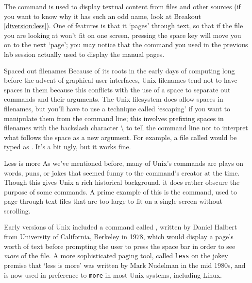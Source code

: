 
The  command is used to display textual content from files and other sources (if you want to know why it has such an odd name, look at Breakout \ref{diversion:less}). One of  features is that it `pages' through text, so that if the file you are looking at won't fit on one screen, pressing the space key will move you on to the next `page'; you may notice that the  command you used in the previous lab session actually used  to display the manual pages.

\begin{linux}{Spaced out filenames}
Because of its roots in the early days of computing long before the advent of graphical user interfaces, Unix filenames tend not to have spaces in them because this conflicts with the use of a space to separate out commands and their arguments. The Unix filesystem does allow spaces in filenames, but you'll have to use a technique called `escaping' if you want to manipulate them from the command line; this involves prefixing spaces in filenames with the backslash character \textbackslash{} to tell the command line not to interpret what follows the space as a new argument. For example, a file called  would be typed as . It's a bit ugly, but it works fine. 
\end{linux} 

\begin{diversion}{Less is more}
\label{diversion:less}
As we've mentioned before, many of Unix's commands are plays on words, puns, or jokes that seemed funny to the command's creator at the time. Though this gives Unix a rich historical background, it does rather obscure the purpose of some commands. A prime example of this is the  command, used to page through text files that are too large to fit on a single screen without scrolling. 

Early versions of Unix included a command called , written by Daniel Halbert from University of California, Berkeley in 1978, which would display a page's worth of text before prompting the user to press the space bar in order to see \textit{more} of the file. A more sophisticated paging tool, called \texttt{less} on the jokey premise that `less is more' was written by Mark Nudelman in the mid 1980s, and is now used in preference to  \texttt{more} in most Unix systems, including Linux. 
\end{diversion}

